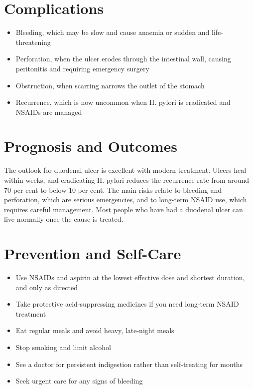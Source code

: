 \section*{Complications}
\begin{itemize}
    \item Bleeding, which may be slow and cause anaemia or sudden and life-threatening
    \item Perforation, when the ulcer erodes through the intestinal wall, causing peritonitis and requiring emergency surgery
    \item Obstruction, when scarring narrows the outlet of the stomach
    \item Recurrence, which is now uncommon when H. pylori is eradicated and NSAIDs are managed
\end{itemize}

\section*{Prognosis and Outcomes}
The outlook for duodenal ulcer is excellent with modern treatment. Ulcers heal within weeks, and eradicating H. pylori reduces the recurrence rate from around 70 per cent to below 10 per cent. The main risks relate to bleeding and perforation, which are serious emergencies, and to long-term NSAID use, which requires careful management. Most people who have had a duodenal ulcer can live normally once the cause is treated.

\section*{Prevention and Self-Care}
\begin{itemize}
    \item Use NSAIDs and aspirin at the lowest effective dose and shortest duration, and only as directed
    \item Take protective acid-suppressing medicines if you need long-term NSAID treatment
    \item Eat regular meals and avoid heavy, late-night meals
    \item Stop smoking and limit alcohol
    \item See a doctor for persistent indigestion rather than self-treating for months
    \item Seek urgent care for any signs of bleeding
\end{itemize}

